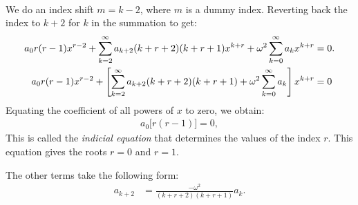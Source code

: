 \begin{enumerate}[label={(\arabic*)}]
\begin{enumerate}[label={(\alph*)}]
\begin{align}
    \end{align}
    We do an index shift $m = k-2$, where $m$ is a dummy index. Reverting back the index to $k+2$ for $k$ in the  summation to get:
    \begin{align}
        a_0 r(r-1) x^{r-2} + \sum_{k=2}^\infty a_{k+2} (k+r+2)(k+r+1) x^{k+r} + \omega^2 \sum_{k=0}^{\infty} a_k x^{k+r}&=0.\notag\\
        a_0 r(r-1) x^{r-2} + \left[\sum_{k=2}^\infty a_{k+2} (k+r+2)(k+r+1) + \omega^2 \sum_{k=0}^{\infty} a_k\right]x^{k+r}&=0
    \end{align}
    Equating the coefficient of all powers of $x$ to zero, we obtain:
    \begin{align}
        a_0 \bigg[ r(r-1) \bigg] = 0, 
    \end{align}
    This is called the \textit{indicial equation} that determines the values of the index $r$. This equation gives the roots $r = 0$ and $r = 1$.
    
    The other terms take the following form:
    \begin{align}
        a_{k+2} &= \frac{-\omega^2}{(k+r+2)(k+r+1)}a_k.\label{eq:first-frebonius-type}
    \end{align}

\end{enumerate}
\end{enumerate}

